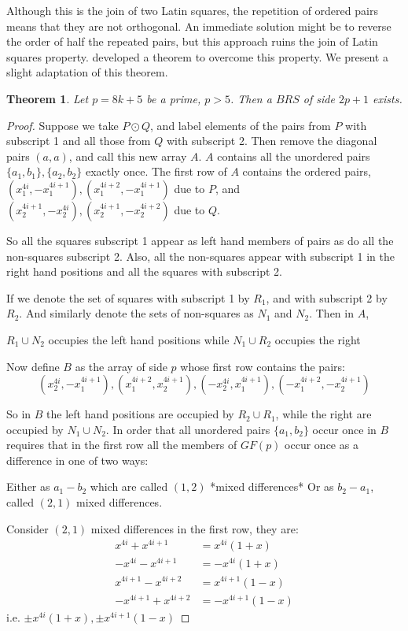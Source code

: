 \documentclass[11pt, a4paper]{book}\usepackage[]{graphicx}\usepackage[]{xcolor}
\newtheorem{theorem}{Theorem}
\begin{document}
Although this is the join of two Latin squares, the
repetition of ordered pairs means that they are not
orthogonal. An immediate solution might be to reverse the
order of half the repeated pairs, but this approach ruins
the join of Latin squares property.
\cite{andersonConstructionBalancedRoom1999}
developed a theorem to overcome this property. We present a
slight adaptation of this theorem.
\begin{theorem}
Let $p = 8k + 5$ be a prime, $p > 5$. Then a $BRS$ of side
$2p + 1$ exists.
\end{theorem}
\begin{proof}
Suppose we take $P \odot Q$, and label elements of the pairs
from $P$ with subscript 1 and all those from $Q$ with
subscript 2. Then remove the diagonal pairs $(a, a)$, and
call this new array $A$. $A$ contains all the unordered
pairs $\{a_1, b_1\},\{a_2, b_2\}$ exactly once. The first row
of $A$ contains the ordered pairs,
$(x_1^{4i}, -x_1^{4i + 1}), (x_1^{4i + 2}, -x_1^{4i + 1})$
due to $P$, and
$(x_2^{4i + 1}, -x_2^{4i}), (x_2^{4i + 1}, -x_2^{4i  +2})$
due to $Q$.

So all the squares subscript 1 appear as left hand members
of pairs as do all the non-squares subscript 2. Also, all
the non-squares appear with subscript 1 in the right hand
positions and all the squares with
subscript 2.

If we denote the set of squares with subscript 1 by $R_1$,
and with subscript 2 by $R_2$. And similarly denote the sets
of non-squares as $N_1$ and $N_2$. Then in $A$,

$R_1 \cup N_2$ occupies the left hand positions
while $N_1 \cup R_2$ occupies the right

Now define $B$ as the array of side $p$ whose first row
contains the pairs:
\begin{equation}
(x_2^{4i}, -x_1^{4i + 1}), (x_1^{4i + 2}, x_2^{4i + 1}), (-x_2^{4i}, x_1^{4i + 1}), (-x_1^{4i + 2}, -x_2^{4i + 1})
\end{equation}

So in $B$ the left hand positions are occupied by
$R_2 \cup R_1$, while the right are occupied by
$N_1 \cup N_2$.  In order that all unordered pairs
$\{a_1, b_2\}$ occur once in $B$ requires that in the first
row all the members of $GF(p)$ occur once as a difference
in one of two ways:

Either as $a_1 - b_2$ which are called $(1, 2)$
*mixed differences* Or as $b_2 - a_1$, called $(2, 1)$
mixed differences.

Consider $(2, 1)$ mixed differences in the first row, they
are:
\begin{align*}
       x^{4i} + x^{4i + 1} &= x^{4i}(1 + x)      \\
      -x^{4i} - x^{4i + 1} &=-x^{4i}(1 + x)      \\
   x^{4i + 1} - x^{4i + 2} &= x^{4i + 1}(1 - x)  \\
  -x^{4i + 1} + x^{4i + 2} &= -x^{4i + 1}(1 - x)
\end{align*}
i.e. $\pm x^{4i}(1 + x), \pm x^{4i + 1}(1 - x)$


\end{proof}
\end{document}
